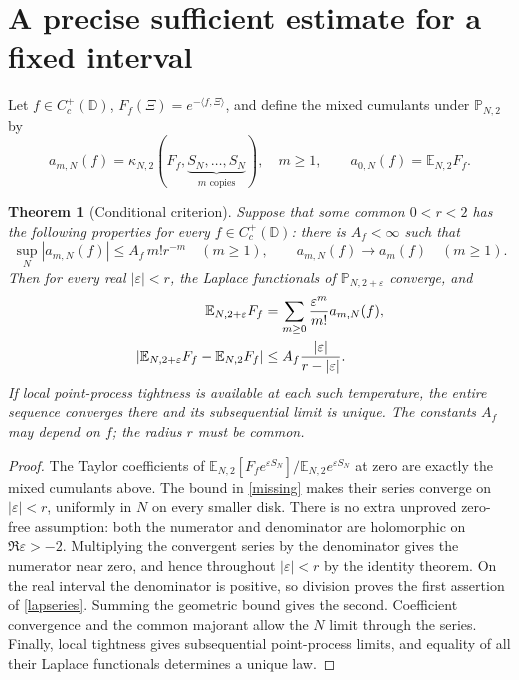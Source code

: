 \documentclass[11pt]{article}
\newtheorem{theorem}{Theorem}[section]
\theoremstyle{remark}\newtheorem{remark}[theorem]{Remark}
\newcommand{\D}{\mathbb D}
\newcommand{\E}{\mathbb E}
\newcommand{\Pp}{\mathbb P}
\begin{document}
\section{A precise sufficient estimate for a fixed interval}
Let $f\in C_c^+(\D)$, $F_f(\Xi)=e^{-\langle f,\Xi\rangle}$, and define
the mixed cumulants under $\Pp_{N,2}$ by
\[
 a_{m,N}(f)=\kappa_{N,2}
   (F_f,\underbrace{S_N,\ldots,S_N}_{m\text{ copies}}),\quad m\ge1,
 \qquad a_{0,N}(f)=\E_{N,2}F_f.
\]
\begin{theorem}[Conditional criterion]\label{conditional}
Suppose that some common $0<r<2$ has the following properties for every
$f\in C_c^+(\D)$: there is $A_f<\infty$ such that
\begin{equation}\label{missing}
 \sup_N|a_{m,N}(f)|\le A_f\,m!r^{-m}\quad(m\ge1),
 \qquad a_{m,N}(f)\longrightarrow a_m(f)\quad(m\ge1).
\end{equation}
Then for every real $|\varepsilon|<r$, the Laplace functionals of
$\Pp_{N,2+\varepsilon}$ converge, and
\begin{align}\label{lapseries}
 \E_{N,2+\varepsilon}F_f
 &=\sum_{m\ge0}\frac{\varepsilon^m}{m!}a_{m,N}(f),\notag\\
 \left|\E_{N,2+\varepsilon}F_f-\E_{N,2}F_f\right|
 &\le A_f\frac{|\varepsilon|}{r-|\varepsilon|}.
\end{align}
If local point-process tightness is available at each such temperature,
the entire sequence converges there and its subsequential limit is unique.
The constants $A_f$ may depend on $f$; the radius $r$ must be common.
\end{theorem}
\begin{proof}
The Taylor coefficients of
$\E_{N,2}[F_fe^{\varepsilon S_N}]/\E_{N,2}e^{\varepsilon S_N}$ at zero
are exactly the mixed cumulants above. The bound in \eqref{missing}
makes their series converge on $|\varepsilon|<r$, uniformly in $N$ on
every smaller disk. There is no extra unproved zero-free assumption:
both the numerator and denominator are holomorphic on
$\Re\varepsilon>-2$. Multiplying the convergent series by the denominator
gives the numerator near zero, and hence throughout $|\varepsilon|<r$
by the identity theorem. On the real interval the denominator is positive,
so division proves the first assertion of \eqref{lapseries}. Summing the
geometric bound gives the second. Coefficient convergence and the common
majorant allow the $N$ limit through the series. Finally, local tightness
gives subsequential point-process limits, and equality of all their
Laplace functionals determines a unique law.
\end{proof}
\end{document}
